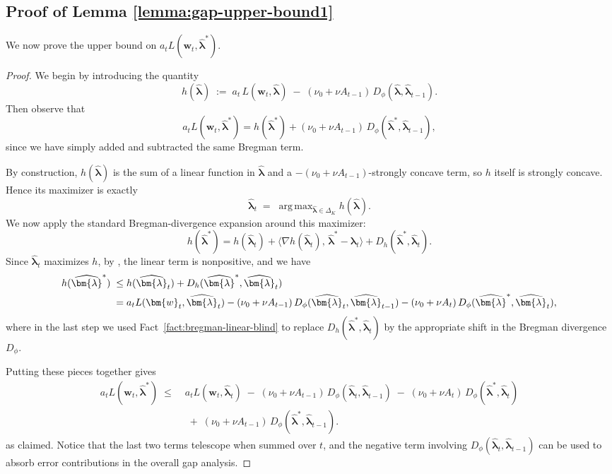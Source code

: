 \documentclass[11pt]{article}
\numberwithin{thm}{section}
\theoremstyle{plain}
\theoremstyle{definition}
\theoremstyle{remark} \newtheorem{remark}[thm]{Remark}
\def\vlambda{{\bm{\lambda}}}
\def\vw{{\bm{w}}}
\DeclareMathOperator*{\argmax}{arg\,max}
\newcommand{\evlambda}{\widehat{\vlambda}}
\begin{document}
\subsection{Proof of Lemma \ref{lemma:gap-upper-bound1}}
\label{sec:gap-upper-bound1}
We now prove the upper bound on \(a_tL(\vw_{t}, \evlambda^{*})\).
\lemGapUpperOne*
\begin{proof}
	We begin by introducing the quantity
	\[
	h(\evlambda)\;:=\;a_t\,L(\vw_t,\evlambda)\;-\;(\nu_0+\nu A_{t-1})\,D_{\phi}(\evlambda,\evlambda_{t-1}).
	\]
	Then observe that
	\[
	a_tL(\vw_t,\evlambda^{*})
	= h(\evlambda^{*})
	+(\nu_0+\nu A_{t-1})\,D_{\phi}(\evlambda^{*},\evlambda_{t-1}),
	\]
	since we have simply added and subtracted the same Bregman term. 
	
	By construction, $h(\evlambda)$ is the sum of a linear function in $\evlambda$ and a $-(\nu_0+\nu A_{t-1})$-strongly concave term, so $h$ itself is strongly concave. Hence its maximizer is exactly
	\[
	\evlambda_t
	\;=\;\argmax_{\evlambda\in\Delta_K}h(\evlambda).
	\]
	We now apply the standard Bregman-divergence expansion around this maximizer:
	\[
	h(\evlambda^{*})
	= h(\evlambda_t)
	+\bigl\langle\nabla h(\evlambda_t),\,\evlambda^{*}-\evlambda_t\bigr\rangle
	+D_{h}(\evlambda^{*},\evlambda_t).
	\]
	Since $\evlambda_t$ maximizes $h$, by , the linear term is nonpositive, and we have
	\begin{align*}
		h(\evlambda^{*})
		&\; \le h(\evlambda_t) +D_{h}(\evlambda^*,\evlambda_t) \\ \notag
		&\; = a_tL(\vw_t,\evlambda_t)
		-(\nu_0+\nu A_{t-1})\,D_{\phi}(\evlambda_t,\evlambda_{t-1})
		-(\nu_0+\nu A_t)\,D_{\phi}(\evlambda^{*},\evlambda_t),
	\end{align*}
	where in the last step we used Fact~\ref{fact:bregman-linear-blind} to replace $D_h(\evlambda^{*},\evlambda_t)$ by the appropriate shift in the Bregman divergence $D_{\phi}$. 
	
	Putting these pieces together gives
	\begin{align*}
		a_tL(\vw_t, \evlambda^{*})
		\;\le\;&
		a_tL(\vw_t, \evlambda_t)
		\;-\;(\nu_0+\nu A_{t-1})\,D_{\phi}(\evlambda_t,\evlambda_{t-1})
		\;-\;(\nu_0+\nu A_t)\,D_{\phi}(\evlambda^{*},\evlambda_t)\\
		&\;+\;(\nu_0+\nu A_{t-1})\,D_{\phi}(\evlambda^{*},\evlambda_{t-1}).
	\end{align*}
	as claimed. Notice that the last two terms telescope when summed over \(t\), and the negative term involving \(D_{\phi}(\evlambda_t,\evlambda_{t-1})\) can be used to absorb error contributions in the overall gap analysis.
\end{proof}
\end{document}
